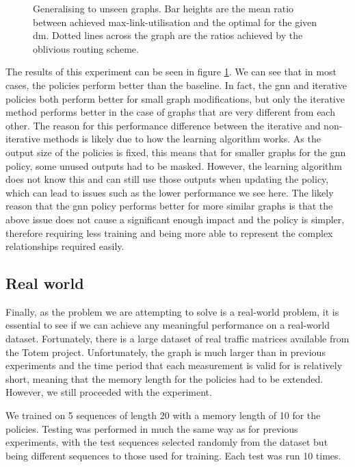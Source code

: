 \begin{figure}
    \centering
    \resizebox{\textwidth}{!}{}
    \caption{Generalising to unseen graphs. Bar heights are the mean ratio between achieved max-link-utilisation and the optimal for the given \ac{dm}. Dotted lines across the graph are the ratios achieved by the oblivious routing scheme.}
    \label{fig:exp_graphs}
\end{figure}

The results of this experiment can be seen in figure \ref{fig:exp_graphs}. We can see that in most cases, the policies perform better than the baseline. In fact, the \ac{gnn} and iterative policies both perform better for small graph modifications, but only the iterative method performs better in the case of graphs that are very different from each other. The reason for this performance difference between the iterative and non-iterative methods is likely due to how the learning algorithm works. As the output size of the policies is fixed, this means that for smaller graphs for the \ac{gnn} policy, some unused outputs had to be masked. However, the learning algorithm does not know this and can still use those outputs when updating the policy, which can lead to issues such as the lower performance we see here. The likely reason that the \ac{gnn} policy performs better for more similar graphs is that the above issue does not cause a significant enough impact and the policy is simpler, therefore requiring less training and being more able to represent the complex relationships required easily.

\subsection{Real world}
Finally, as the problem we are attempting to solve is a real-world problem, it is essential to see if we can achieve any meaningful performance on a real-world dataset. Fortunately, there is a large dataset of real traffic matrices available from the Totem\cite{uhlig2006providing} project. Unfortunately, the graph is much larger than in previous experiments and the time period that each measurement is valid for is relatively short, meaning that the memory length for the policies had to be extended. However, we still proceeded with the experiment.

We trained on 5 sequences of length 20 with a memory length of 10 for the policies. Testing was performed in much the same way as for previous experiments, with the test sequences selected randomly from the dataset but being different sequences to those used for training. Each test was run 10 times.

